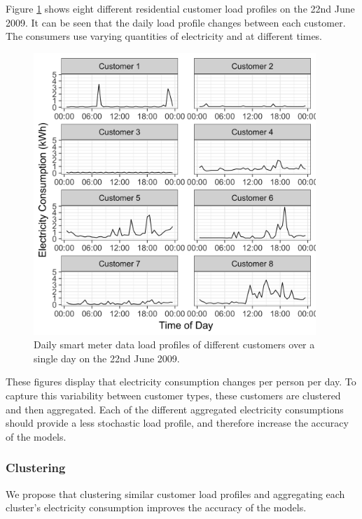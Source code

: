 Figure \ref{fig:multiple_users} shows eight different residential customer load profiles on the 22nd June 2009. It can be seen that the daily load profile changes between each customer. The consumers use varying quantities of electricity and at different times. 




\begin{figure}
	\centering
	\includegraphics[width=0.95\textwidth]{Chapter5/figures/short-term-forecasting/Rplot02.png}
	\caption{Daily smart meter data load profiles of different customers over a single day on the 22nd June 2009.}
	\label{fig:multiple_users}
\end{figure}

These figures display that electricity consumption changes per person per day. To capture this variability between customer types, these customers are clustered and then aggregated. Each of the different aggregated electricity consumptions should provide a less stochastic load profile, and therefore increase the accuracy of the models.

\subsubsection{Clustering}

We propose that clustering similar customer load profiles and aggregating each cluster's electricity consumption improves the accuracy of the models. 

